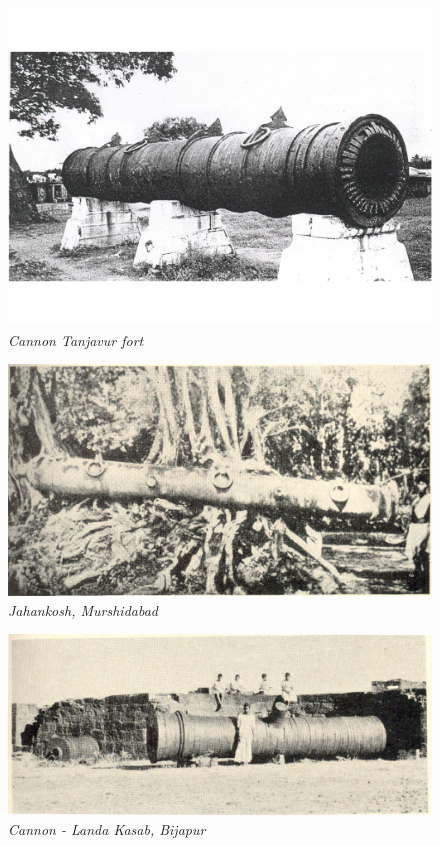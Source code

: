 \begin{figure}[H]
\setcounter{figure}{29}
\includegraphics[scale=1]{images/chapter-5/Fig30.jpg}

\vspace{-.7cm}
\caption{\textit{Cannon Tanjavur fort}}\label{chapter-5-fig30}
\end{figure}

\begin{figure}[H]
\includegraphics[scale=.8]{images/chapter-5/Fig31.jpg}
\caption{\textit{Jahankosh, Murshidabad}}\label{chapter-5-fig31}
\end{figure}

\newpage

\begin{figure}[H]
\includegraphics[scale=.7]{images/chapter-5/Fig32.jpg}
\caption{\textit{Cannon - Landa Kasab, Bijapur}}\label{chapter-5-fig32}
\end{figure}

